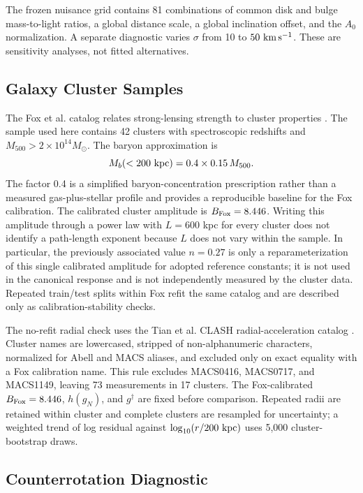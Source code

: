 \documentclass[aps,prd,reprint,superscriptaddress,showpacs,floatfix,longbibliography]{revtex4-2}
\begin{document}
The frozen nuisance grid contains 81 combinations of common disk and bulge mass-to-light ratios, a global distance scale, a global inclination offset, and the $A_0$ normalization. A separate diagnostic varies $\sigma$ from 10 to $50\ {\rm km\,s^{-1}}$. These are sensitivity analyses, not fitted alternatives.

\subsection{Galaxy Cluster Samples}

The Fox et al. catalog relates strong-lensing strength to cluster properties \cite{ref8}. The sample used here contains 42 clusters with spectroscopic redshifts and $M_{500}>2\times10^{14}M_\odot$. The baryon approximation is
\begin{equation}
M_b(<200\ {\rm kpc})=0.4\times0.15\,M_{500}.
\label{eq:clusterbaryon}
\end{equation}
The factor 0.4 is a simplified baryon-concentration prescription rather than a measured gas-plus-stellar profile and provides a reproducible baseline for the Fox calibration. The calibrated cluster amplitude is $B_{\rm Fox}=8.446$. Writing this amplitude through a power law with $L=600$ kpc for every cluster does not identify a path-length exponent because $L$ does not vary within the sample. In particular, the previously associated value $n=0.27$ is only a reparameterization of this single calibrated amplitude for adopted reference constants; it is not used in the canonical response and is not independently measured by the cluster data. Repeated train/test splits within Fox refit the same catalog and are described only as calibration-stability checks.

The no-refit radial check uses the Tian et al. CLASH radial-acceleration catalog \cite{ref9}. Cluster names are lowercased, stripped of non-alphanumeric characters, normalized for Abell and MACS aliases, and excluded only on exact equality with a Fox calibration name. This rule excludes MACS0416, MACS0717, and MACS1149, leaving 73 measurements in 17 clusters. The Fox-calibrated $B_{\rm Fox}=8.446$, $h(g_N)$, and $g^\dagger$ are fixed before comparison. Repeated radii are retained within cluster and complete clusters are resampled for uncertainty; a weighted trend of log residual against $\log_{10}(r/200\ {\rm kpc})$ uses 5,000 cluster-bootstrap draws.

\subsection{Counterrotation Diagnostic}
\end{document}
